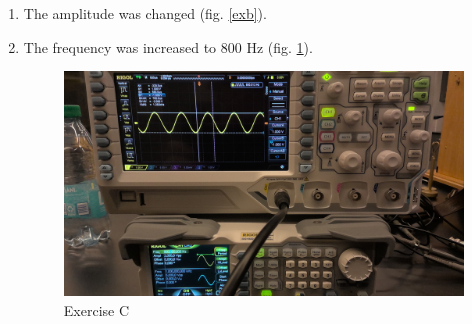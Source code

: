 \documentclass{article}
\begin{document}
\begin{enumerate}[label=(\alph*)]
                \item The amplitude was changed (fig. \ref{exb}).
                
                \item The frequency was increased to 800 Hz (fig. \ref{exc}).
                \begin{figure}[p]
                    \centering
                    \includegraphics[width=\textwidth/2]{c.jpg}
                    \caption{Exercise C}
                    \label{exc}
                \end{figure}
                

\end{enumerate}
\end{document}
